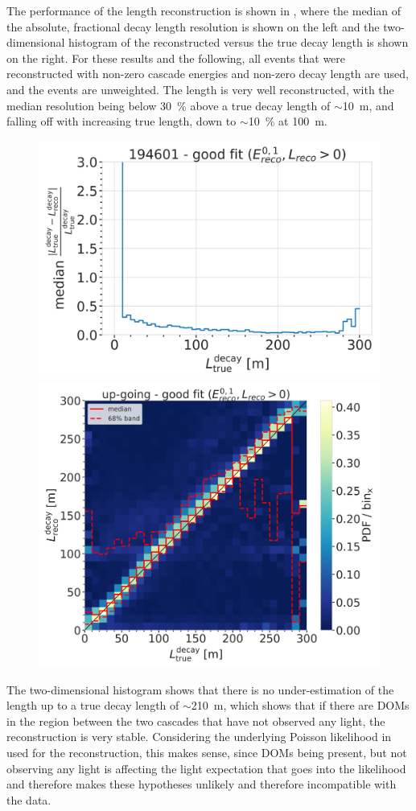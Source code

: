The performance of the length reconstruction is shown in , where the median of the absolute, fractional decay length resolution is shown on the left and the two-dimensional histogram of the reconstructed versus the true decay length is shown on the right. For these results and the following, all events that were reconstructed with non-zero cascade energies and non-zero decay length are used, and the events are unweighted. The length is very well reconstructed, with the median resolution being below \SI{30}{\percent} above a true decay length of $\sim$\SI{10}{\meter}, and falling off with increasing true length, down to $\sim$\SI{10}{\percent} at \SI{100}{\meter}.

\begin{figure}[h]
	\centering
    \includegraphics[width=0.49\linewidth]{figures/model_independent_simulation/results/idealistic/194601_median_decay_length_resolution_goodfit_log_unweighted.png}
    \includegraphics[width=0.49\linewidth]{figures/model_independent_simulation/results/idealistic/194601_reco_decay_length_vs_true_decay_length_goodfit_step_contours.png}
    \caption[]{}
\end{figure}

The two-dimensional histogram shows that there is no under-estimation of the length up to a true decay length of $\sim$\SI{210}{\meter}, which shows that if there are DOMs in the region between the two cascades that have not observed any light, the reconstruction is very stable. Considering the underlying Poisson likelihood in  used for the reconstruction, this makes sense, since DOMs being present, but not observing any light is affecting the light expectation that goes into the likelihood and therefore makes these hypotheses unlikely and therefore incompatible with the data.



